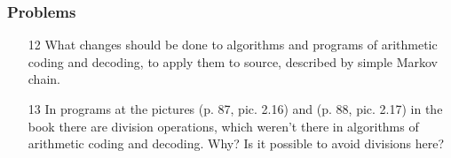 \documentclass[14pt]{beamer}
\begin{document}
\begin{frame}
\frametitle{Problems}
\begin{enumerate}


 \item[12] What changes should be done to algorithms and programs of arithmetic coding and decoding, to apply them to source, described by simple Markov chain.
 

\pause \item[13]  In programs at the pictures (p. 87, pic. 2.16) and (p. 88, pic. 2.17) in the book there are division operations, which weren't there in algorithms of arithmetic coding and decoding. Why? Is it possible to avoid divisions here?


\end{enumerate}
\end{frame}
\end{document}
